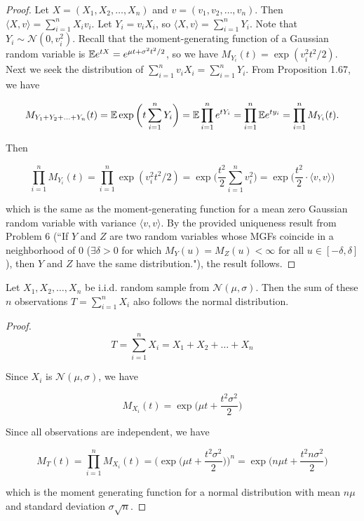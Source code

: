 \begin{proof} Let \(X = (X_1, X_2, \ldots, X_n)\) and \(v = (v_1, v_2, \ldots, v_n)\). Then \(\langle X, v \rangle = \sum_{i=1}^n X_i v_i\). Let \(Y_i = v_i X_i\), so  \(\langle X, v \rangle = \sum_{i=1}^n Y_i\). Note that \(Y_i \sim \mathcal{N}(0, v_i^2)\). Recall that the moment-generating function of a Gaussian random variable is \(\mathbb{E} e^{tX} =   e^{\mu t + \sigma^2t^2/2}\), so we have \(M_{Y_i}(t) = \exp( v_i^2t^2/2)\).  Next we seek the distribution of \(\sum_{i=1}^n v_i X_i = \sum_{i=1}^n Y_i \). From Proposition 1.67, we have

\[
M_{Y_1 + Y_2 + \ldots + Y_n}(t)  = \mathbb{E} \exp \bigg(t \sum_{i=1}^n Y_i \bigg) =  \mathbb{E} \prod_{i=1}^n e^{tY_i} =\prod_{i=1}^n   \mathbb{E} e^{ty_i} = \prod_{i=1}^n M_{Y_i}(t).
\]

Then

\[
\prod_{i=1}^n M_{Y_i}(t) = \prod_{i=1}^n  \exp( v_i^2t^2/2)= \exp \bigg( \frac{t^2}{2} \sum_{i=1}^n v_i^2\bigg) = \exp \bigg( \frac{t^2}{2} \cdot \langle v, v \rangle \bigg)
\]

which is the same as the moment-generating function for a mean zero Gaussian random variable with variance \(\langle v, v \rangle\). By the provided uniqueness result from Problem 6 (``If $Y$ and $Z$ are two random variables whose MGFs coincide in a neighborhood of 0 ($\exists \delta>0$ for which $M_Y(u) =M_Z(u) < \infty$ for all $u\in[-\delta,\delta]$), then $Y$ and $Z$ have the same distribution."), the result follows. 

\end{proof}

\begin{proposition} Let \(X_1, X_2, \ldots , X_n\) be i.i.d. random sample from \(\mathcal{N}(\mu, \sigma)\). Then the sum of these \(n\) observations \(T = \sum_{i=1}^n X_i\) also follows the normal distribution. 

\end{proposition}

\begin{proof}

\[
T = \sum_{i=1}^n X_i = X_1 + X_2 + \ldots + X_n
\]

Since \(X_i\) is \(\mathcal{N}(\mu, \sigma)\), we have 

\[
M_{X_i}(t) = \exp\bigg(\mu t + \frac{t^2 \sigma^2}{2} \bigg)
\]

Since all observations are independent, we have

\[
M_T(t) = \prod_{i=1}^n M_{X_i}(t) = \bigg(\exp\bigg(\mu t + \frac{t^2 \sigma^2}{2} \bigg)\bigg)^n = \boxed{\exp\bigg(n \mu t + \frac{t^2 n \sigma^2}{2} \bigg)}
\]

which is the moment generating function for a normal distribution with mean \(n \mu\) and standard deviation \(\sigma \sqrt{n}\).

\end{proof}



